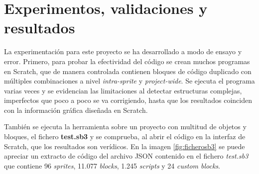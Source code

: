 \documentclass[a4paper, 12pt]{book}
\begin{document}



\cleardoublepage
\chapter{Experimentos, validaciones y resultados}


La experimentación para este proyecto se ha desarrollado a modo de ensayo y error. Primero, para probar la efectividad del código se crean muchos programas en Scratch, que de manera controlada contienen bloques de código duplicado con múltiples combinaciones a nivel \textit{intra-sprite} y \textit{project-wide}. Se ejecuta el programa varias veces y se evidencian las limitaciones al detectar estructuras complejas, imperfectos que poco a poco se va corrigiendo, hasta que los resultados coinciden con la información gráfica diseñada en Scratch. 

También se ejecuta la herramienta sobre un proyecto con multitud de objetos y bloques, el fichero \textbf{test.sb3} y se comprueba, al abrir el código en la interfaz de Scratch, que los resultados son verídicos. En la imagen \ref{fig:ficherosb3} se puede apreciar un extracto de código del archivo JSON contenido en el fichero \textit{test.sb3} que contiene 96 \textit{sprites}, 11.077 \textit{blocks}, 1.245 \textit{scripts} y 24 \textit{custom blocks}. %
\end{document}

